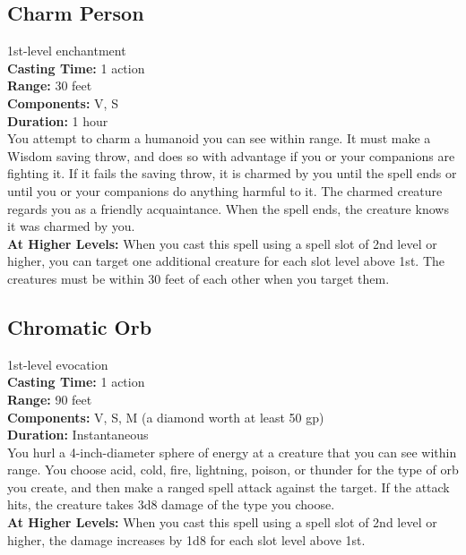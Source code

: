 \documentclass[11pt, A4paper, english]{article}
\begin{document}
		\subsection{Charm Person}
1st-level enchantment \\
\textbf{Casting Time:} 1 action \\
\textbf{Range:} 30 feet \\
\textbf{Components:} V, S \\
\textbf{Duration:} 1 hour \\
You attempt to charm a humanoid you can see within range. It must make a Wisdom saving throw, and does so with advantage if you or your companions are fighting it. If it fails the saving throw, it is charmed by you until the spell ends or until you or your companions do anything harmful to it. The charmed creature regards you as a friendly acquaintance. When the spell ends, the creature knows it was charmed by you. \\
\textbf{At Higher Levels:} When you cast this spell using a spell slot of 2nd level or higher, you can target one additional creature for each slot level above 1st. The creatures must be within 30 feet of each other when you target them.

		\subsection{Chromatic Orb}
1st-level evocation \\
\textbf{Casting Time:} 1 action \\
\textbf{Range:} 90 feet \\
\textbf{Components:} V, S, M (a diamond worth at least 50 gp) \\
\textbf{Duration:} Instantaneous \\
You hurl a 4-inch-diameter sphere of energy at a creature that you can see within range. You choose acid, cold, fire, lightning, poison, or thunder for the type of orb you create, and then make a ranged spell attack against the target. If the attack hits, the creature takes 3d8 damage of the type you choose. \\
\textbf{At Higher Levels:} When you cast this spell using a spell slot of 2nd level or higher, the damage increases by 1d8 for each slot level above 1st.
\end{document}
